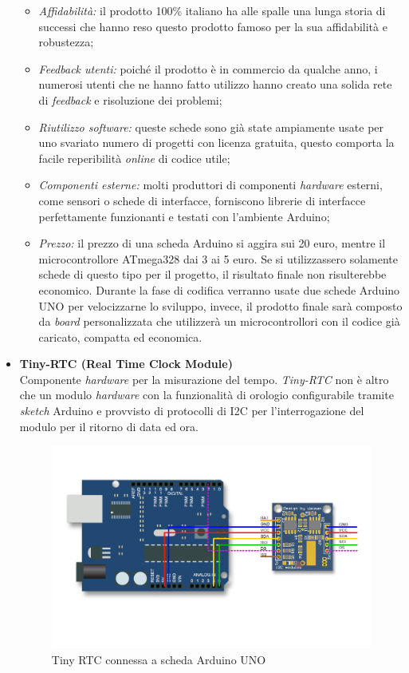 \begin{itemize}
\begin{itemize}
	\item \textit{Affidabilità:} il prodotto 100\% italiano ha alle spalle una lunga storia di successi che hanno reso questo prodotto famoso per la sua affidabilità e robustezza;
	\item \textit{Feedback utenti:} poiché il prodotto è in commercio da qualche anno, i numerosi utenti che ne hanno fatto utilizzo hanno creato una solida rete di \textit{feedback} e risoluzione dei problemi;
	\item \textit{Riutilizzo software:} queste schede sono già state ampiamente usate per uno svariato numero di progetti con licenza gratuita, questo comporta la facile reperibilità \textit{online} di codice utile;
	\item  \textit{Componenti esterne:} molti produttori di componenti \textit{hardware} esterni, come sensori o schede di interfacce, forniscono librerie di interfacce perfettamente funzionanti e testati con l'ambiente Arduino;
	\item \textit{Prezzo:} 	
	il prezzo di una scheda Arduino si aggira sui 20 euro, mentre il microcontrollore ATmega328 dai 3 ai 5 euro. Se si utilizzassero solamente schede di questo tipo per il progetto, il risultato finale non risulterebbe economico. Durante la fase di codifica verranno usate due schede Arduino UNO per velocizzarne lo sviluppo, invece, il prodotto finale sarà composto da \textit{board} personalizzata che utilizzerà un microcontrollori con il codice già caricato, compatta ed economica.
	
	\end{itemize}


\item \textbf{Tiny-RTC (Real Time Clock Module)}\\
Componente \textit{hardware} per la misurazione del tempo. \textit{Tiny-RTC} non è altro che un modulo \textit{hardware} con la funzionalità di orologio configurabile tramite \textit{sketch} Arduino e provvisto di protocolli di I2C per l'interrogazione del modulo per il ritorno di data ed ora. 
\begin{figure}[htbp]
\centering
\includegraphics[scale=.3]{./capitoli/capitolo2/img/rtc}
\caption{Tiny RTC connessa a scheda Arduino UNO}


\end{figure}
\end{itemize}
